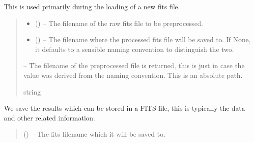 \documentclass[letterpaper,11pt,english]{sphinxmanual}
\begin{document}
\begin{savenotes}
\begin{fulllineitems}
\begin{savenotes}
\begin{fulllineitems}
\sphinxAtStartPar
This is used primarily during the loading of a new fits file.
\begin{quote}\begin{description}
\begin{itemize}
\item {} 
\sphinxAtStartPar
{} () – The filename of the raw fits file to be preprocessed.

\item {} 
\sphinxAtStartPar
{} (\sphinxstyleliteralemphasis{\sphinxupquote{, }}) – The filename where the processed fits file will be saved to. If
None, it defaults to a sensible naming convention to distinguish
the two.

\end{itemize}

\sphinxAtStartPar
{} – The filename of the preprocessed file is returned, this is just
in case the value was derived from the naming convention. This is
an absolute path.

\sphinxAtStartPar
string

\end{description}\end{quote}

\end{fulllineitems}\end{savenotes}


\begin{savenotes}\begin{fulllineitems}
\label{\detokenize{code/opihiexarata.gui.manual:opihiexarata.gui.manual.OpihiManualWindow._save_fits_file_results}}
\pysigstartsignatures
{}
\pysigstopsignatures
\sphinxAtStartPar
We save the results which can be stored in a FITS file, this is
typically the data and other related information.
\begin{quote}\begin{description}
\sphinxAtStartPar
{} () – The fits filename which it will be saved to.


\end{description}
\end{quote}
\end{fulllineitems}
\end{savenotes}
\end{fulllineitems}
\end{savenotes}
\end{document}

